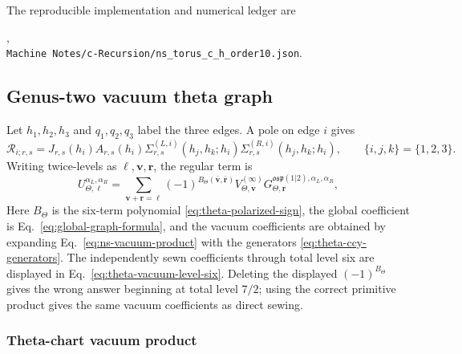 \documentclass[11pt]{article}
\newcommand{\osp}{\mathfrak{osp}(1|2)}
\newcommand{\Rcal}{\mathcal R}
\begin{document}
The reproducible implementation and numerical ledger are
\begin{center}
 ,\\
 \texttt{Machine Notes/c-Recursion/ns\_torus\_c\_h\_order10.json}.
\end{center}

\subsection{Genus-two vacuum theta graph}

Let \(h_1,h_2,h_3\) and \(q_1,q_2,q_3\) label the three edges.  A pole on
edge \(i\) gives
\begin{equation}
 \Rcal_{i;r,s}
 =J_{r,s}(h_i)A_{r,s}(h_i)
  \Sigma_{r,s}^{(L,i)}(h_j,h_k;h_i)
  \Sigma_{r,s}^{(R,i)}(h_j,h_k;h_i),
 \qquad \{i,j,k\}=\{1,2,3\}.
 \label{eq:theta-residue}
\end{equation}
Writing twice-levels as \(\bm\ell,\bm v,\bm r\), the regular term is
\begin{equation}
 \boxed{
 U_{\Theta,\bm\ell}^{\alpha_L,\alpha_R}
 =\sum_{\bm v+\bm r=\bm\ell}
 (-1)^{B_\Theta(\bar{\bm v},\bar{\bm r})}
 V_{\Theta,\bm v}^{(\infty)}
 G_{\Theta,\bm r}^{\osp,\alpha_L,\alpha_R},}
 \label{eq:theta-seed}
\end{equation}
Here \(B_\Theta\) is the six-term polynomial
\eqref{eq:theta-polarized-sign}, the global coefficient is
Eq.~\eqref{eq:global-graph-formula}, and the vacuum coefficients are obtained
by expanding Eq.~\eqref{eq:ns-vacuum-product} with the generators
\eqref{eq:theta-ccy-generators}.  The independently sewn coefficients through
total level six are displayed in Eq.~\eqref{eq:theta-vacuum-level-six}.
Deleting the displayed \((-1)^{B_\Theta}\) gives the wrong answer beginning
at total level \(7/2\); using the correct primitive product gives the same
vacuum coefficients as direct sewing.

\subsubsection{Theta-chart vacuum product}
\end{document}
